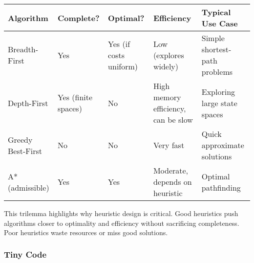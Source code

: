 \documentclass[
  letterpaper,
  DIV=11,
  numbers=noendperiod]{scrreprt}
\begin{document}
\begin{longtable}[]{@{}
  >{\raggedright\arraybackslash}p{}
  >{\raggedright\arraybackslash}p{}
  >{\raggedright\arraybackslash}p{}
  >{\raggedright\arraybackslash}p{}
  >{\raggedright\arraybackslash}p{}@{}}
\toprule\noalign{}
\begin{minipage}[b]{\linewidth}\raggedright
Algorithm
\end{minipage} & \begin{minipage}[b]{\linewidth}\raggedright
Complete?
\end{minipage} & \begin{minipage}[b]{\linewidth}\raggedright
Optimal?
\end{minipage} & \begin{minipage}[b]{\linewidth}\raggedright
Efficiency
\end{minipage} & \begin{minipage}[b]{\linewidth}\raggedright
Typical Use Case
\end{minipage} \\
\midrule\noalign{}
\endhead
\bottomrule\noalign{}
\endlastfoot
Breadth-First & Yes & Yes (if costs uniform) & Low (explores widely) &
Simple shortest-path problems \\
Depth-First & Yes (finite spaces) & No & High memory efficiency, can be
slow & Exploring large state spaces \\
Greedy Best-First & No & No & Very fast & Quick approximate solutions \\
A* (admissible) & Yes & Yes & Moderate, depends on heuristic & Optimal
pathfinding \\
\end{longtable}

This trilemma highlights why heuristic design is critical. Good
heuristics push algorithms closer to optimality and efficiency without
sacrificing completeness. Poor heuristics waste resources or miss good
solutions.

\subsubsection{Tiny Code}\label{tiny-code-63}
\end{document}
